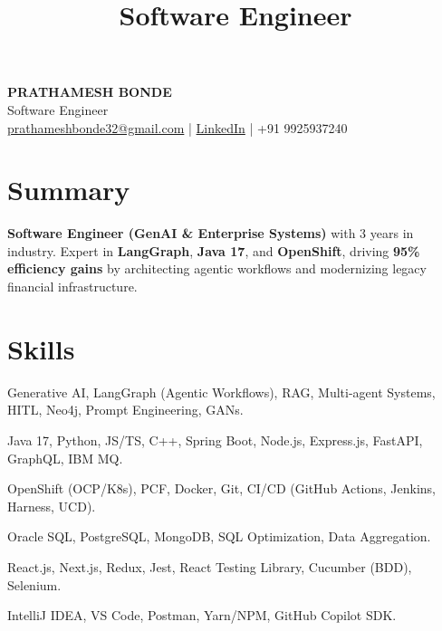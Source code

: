 \documentclass[10pt,a4paper,sans]{moderncv}
\title{Software Engineer}
\begin{document}
\begin{center}
    {\Huge \bfseries \color{primary} PRATHAMESH BONDE} \\
    \vspace{2pt}
    {\large Software Engineer} \\
    \vspace{3pt}
    \small
    \href{mailto:prathameshbonde32@gmail.com}{prathameshbonde32@gmail.com} \quad | \quad 
    \href{https://linkedin.com/in/prathameshbonde}{LinkedIn} \quad | \quad 
    +91 9925937240
\end{center}

\section{Summary}
\textbf{Software Engineer (GenAI \& Enterprise Systems)} with 3 years in industry. Expert in \textbf{LangGraph}, \textbf{Java 17}, and \textbf{OpenShift}, driving \textbf{95\% efficiency gains} by architecting agentic workflows and modernizing legacy financial infrastructure.

\section{Skills}
\begin{description}[leftmargin=0pt, itemsep=-2pt, parsep=1pt, topsep=0pt]
    \item[\textbf{AI \& GenAI:}] Generative AI, LangGraph (Agentic Workflows), RAG, Multi-agent Systems, HITL, Neo4j, Prompt Engineering, GANs.
    \item[\textbf{Languages \& Backend:}] Java 17, Python, JS/TS, C++, Spring Boot, Node.js, Express.js, FastAPI, GraphQL, IBM MQ.
    \item[\textbf{Cloud \& DevOps:}] OpenShift (OCP/K8s), PCF, Docker, Git, CI/CD (GitHub Actions, Jenkins, Harness, UCD).
    \item[\textbf{Databases \& Data:}] Oracle SQL, PostgreSQL, MongoDB, SQL Optimization, Data Aggregation.
    \item[\textbf{Frontend \& Testing:}] React.js, Next.js, Redux, Jest, React Testing Library, Cucumber (BDD), Selenium.
    \item[\textbf{Tools:}] IntelliJ IDEA, VS Code, Postman, Yarn/NPM, GitHub Copilot SDK.
\end{description}
\end{document}
